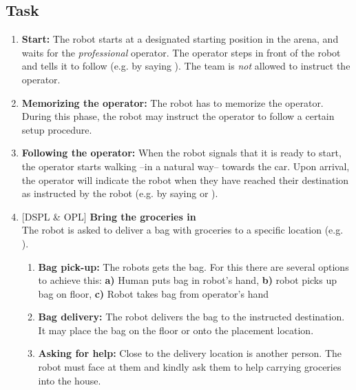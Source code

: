 \subsection{Task}
\begin{enumerate}
  \item \textbf{Start:} The robot starts at a designated starting position in the arena, and waits for the \textit{professional} operator. The operator steps in front of the robot and tells it to follow (e.g. by saying ). The team is \emph{not} allowed to instruct the operator.

  \item \textbf{Memorizing the operator:} The robot has to memorize the operator. During this phase, the robot may instruct the operator to follow a certain setup procedure.

  \item \textbf{Following the operator:} When the robot signals that it is ready to start, the operator starts walking --in a natural way-- towards the car. Upon arrival, the operator will indicate the robot when they have reached their destination as instructed by the robot (e.g. by saying  or ).

  \setcounter{enumTemp}{\theenumi}
  \item {[DSPL \& OPL]} \textbf{Bring the groceries in} \\
  The robot is asked to deliver a bag with groceries  to a specific location (e.g. ).
  \begin{enumerate}
    \item \textbf{Bag pick-up:} The robots gets the bag. For this there are several options to achieve this:
      \textbf{a)} Human puts bag in robot's hand,
      \textbf{b)} robot picks up bag on floor,
      \textbf{c)} Robot takes bag from operator's hand
    \item \textbf{Bag delivery:} The robot delivers the bag to the instructed destination. It may place the bag on the floor or onto the placement location.\\

    \item \textbf{Asking for help:} Close to the delivery location is another person. The robot must face at them and kindly ask them to help carrying groceries into the house.
  \end{enumerate}


\end{enumerate}
